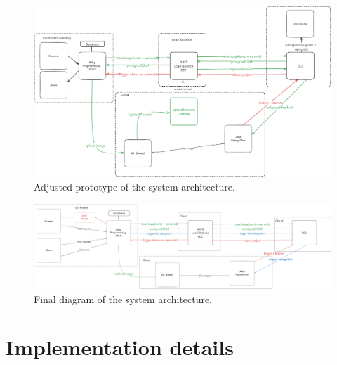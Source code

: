 \documentclass[conference]{IEEEtran}
\begin{document}
\begin{figure}[h!]
      \centering
      \includegraphics[width=1\linewidth]{images/architecturev2.excalidraw.png}
      \caption{Adjusted prototype of the system architecture.}
      \label{fig:prototype-adjusted}
\end{figure}

\begin{figure}[h!]
      \centering
      \includegraphics[width=1\linewidth]{images/architecture_final.excalidraw.png}
      \caption{Final diagram of the system architecture.}
      \label{fig:final-diagram}
\end{figure}
\newpage
\section{Implementation details}
\end{document}

